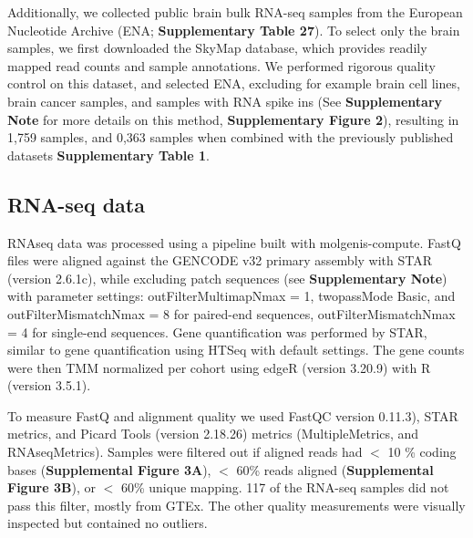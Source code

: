 Additionally, we collected public brain bulk RNA-seq samples from the European Nucleotide Archive (ENA; \textbf{Supplementary Table 27}). To select only the brain samples, we first downloaded the SkyMap database\cite{tsuiExtractingAllelicRead2018}, which provides readily mapped read counts and sample annotations. We performed rigorous quality control on this dataset, and selected ENA, excluding for example brain cell lines, brain cancer samples, and samples with RNA spike ins (See \textbf{Supplementary Note} for more details on this method, \textbf{Supplementary Figure 2}), resulting in 1,759 samples, and 0,363 samples when combined with the previously published datasets \textbf{Supplementary Table 1}. 

\subsection{RNA-seq data}
RNAseq data was processed using a pipeline built with molgenis-compute\cite{byelasMOLGENISBasedComputational2011}. FastQ files were aligned against the GENCODE\cite{frankishGENCODEReferenceAnnotation2019} v32 primary assembly with STAR\cite{dobinSTARUltrafastUniversal2013} (version 2.6.1c), while excluding patch sequences (see \textbf{Supplementary Note}) with parameter settings: outFilterMultimapNmax = 1, twopassMode Basic, and outFilterMismatchNmax = 8 for paired-end sequences, outFilterMismatchNmax = 4 for single-end sequences. Gene quantification was performed by STAR, similar to gene quantification using HTSeq\cite{andersHTSeqPythonFramework2015} with default settings. The gene counts were then TMM\cite{robinsonScalingNormalizationMethod2010} normalized per cohort using edgeR\cite{robinsonEdgeRBioconductorPackage2010} (version 3.20.9) with R\cite{rcoreteamLanguageEnvironmentStatistical2017} (version 3.5.1). 

To measure FastQ and alignment quality we used FastQC\cite{BabrahamBioinformaticsFastQC} version 0.11.3), STAR\cite{dobinSTARUltrafastUniversal2013} metrics, and Picard Tools\cite{broadinstitutePicardTools2019} (version 2.18.26) metrics (MultipleMetrics, and RNAseqMetrics). Samples were filtered out if aligned reads had $<$ 10
\% coding bases (\textbf{Supplemental Figure 3A}), $<$ 60\% reads aligned (\textbf{Supplemental Figure 3B}), or $<$ 60\% unique mapping. 117 of the RNA-seq samples did not pass this filter, mostly from GTEx\cite{consortiumGTExConsortiumAtlas2020}. The other quality measurements were visually inspected but contained no outliers. 


